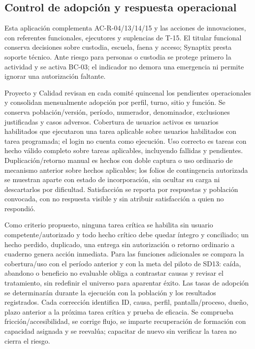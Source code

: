 \subsection{Control de adopción y respuesta operacional}\label{sec:sd8-adopcion-respuesta}
Esta aplicación complementa AC-R-04/13/14/15 y las acciones de innovaciones, con referentes funcionales, ejecutores y suplencias de T-15. El titular funcional conserva decisiones sobre custodia, escuela, faena y acceso; Synaptix presta soporte técnico. Ante riesgo para personas o custodia se protege primero la actividad y se activa BC-03; el indicador no demora una emergencia ni permite ignorar una autorización faltante.

Proyecto y Calidad revisan en cada comité quincenal los pendientes operacionales y consolidan mensualmente adopción por perfil, turno, sitio y función. Se conserva población/versión, período, numerador, denominador, exclusiones justificadas y casos adversos. Cobertura de usuarios activos es usuarios habilitados que ejecutaron una tarea aplicable sobre usuarios habilitados con tarea programada; el login no cuenta como ejecución. Uso correcto es tareas con hecho válido completo sobre tareas aplicables, incluyendo fallidas y pendientes. Duplicación/retorno manual es hechos con doble captura o uso ordinario de mecanismo anterior sobre hechos aplicables; los folios de contingencia autorizada se muestran aparte con estado de incorporación, sin ocultar su carga ni descartarlos por dificultad. Satisfacción se reporta por respuestas y población convocada, con no respuesta visible y sin atribuir satisfacción a quien no respondió. \parencite[art.~89; p.~45]{sd8-ba}

Como criterio propuesto, ninguna tarea crítica se habilita sin usuario competente/autorizado y todo hecho crítico debe quedar íntegro y conciliado; un hecho perdido, duplicado, una entrega sin autorización o retorno ordinario a cuaderno genera acción inmediata. Para las funciones adicionales se compara la cobertura/uso con el período anterior y con la meta del piloto de SD13: caída, abandono o beneficio no evaluable obliga a contrastar causas y revisar el tratamiento, sin redefinir el universo para aparentar éxito. Las tasas de adopción se determinarán durante la ejecución con la población y los resultados registrados. Cada corrección identifica ID, causa, perfil, pantalla/proceso, dueño, plazo anterior a la próxima tarea crítica y prueba de eficacia. Se comprueba fricción/accesibilidad, se corrige flujo, se imparte recuperación de formación con capacidad asignada y se reevalúa; capacitar de nuevo sin verificar la tarea no cierra el riesgo.

